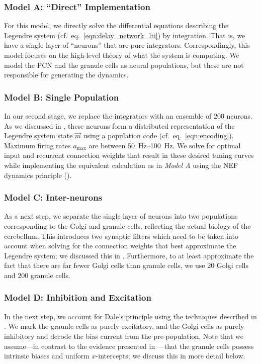 \subsubsection{Model A: \enquote{Direct} Implementation} 
For this model, we directly solve the differential equations describing the Legendre system (cf.~eq.~\ref{eqn:delay_network_lti}) by integration.
That is, we have a single layer of \enquote{neurons} that are pure integrators.
Correspondingly, this model focuses on the high-level theory of what the system is computing.
We model the PCN and the granule cells as neural populations, but these are not responsible for generating the dynamics.

\subsubsection{Model B: Single Population}
In our second stage, we replace the integrators with an ensemble of $200$ \LIF neurons.
As we discussed in , these neurons form a distributed representation of the Legendre system state $\vec{m}$ using a population code (cf.~eq.~\ref{eqn:encoding}).
Maximum firing rates $a_\mathrm{max}$ are between \SIrange{50}{100}{\hertz}.
We solve for optimal input and recurrent connection weights that result in these desired tuning curves while implementing the equivalent calculation as in \emph{Model A} using the NEF dynamics principle ().

\subsubsection{Model C: Inter-neurons}
As a next step, we separate the single layer of neurons into two populations corresponding to the Golgi and granule cells, reflecting the actual biology of the cerebellum.
This introduces two synaptic filters which need to be taken into account when solving for the connection weights that best approximate the Legendre system; we discussed this in .
Furthermore, to at least approximate the fact that there are far fewer Golgi cells than granule cells, we use $20$ Golgi cells and $200$ granule cells.

\subsubsection{Model D: Inhibition and Excitation}
In the next step, we account for Dale's principle using the techniques described in .
We mark the graunle cells as purely excitatory, and the Golgi cells as purely inhibitory and decode the bias current from the pre-population.
Note that we assume---in contrast to the evidence presented in ---that the granule cells possess intrinsic biases and uniform $x$-intercepts; we discuss this in more detail below.

